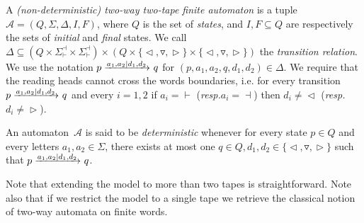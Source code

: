 \documentclass[runningheads, envcountsame, a4paper]{llncs}
\newcommand*{\ie}{i.e.\xspace}
\newcommand*{\resp}{\emph{resp.}\xspace}
\newcommand*{\bmark}{\vdash}
\newcommand*{\emark}{\dashv}
\newcommand*{\alphabet}{\Sigma}
\newcommand*{\atm}{\mathcal{A}}
\newcommand*{\states}{Q}
\newcommand*{\init}{I}
\newcommand*{\final}{F}
\newcommand*{\transrel}{\Delta}
\newcommand*{\goleft}{\vartriangleleft}
\newcommand*{\goright}{\vartriangleright}
\newcommand*{\stay}{\triangledown}
\newcommand*{\moves}{\{\goleft, \stay, \goright\}}
\newcommand*{\addbounds}[1]{{#1}^\emark_\bmark}
\newcommand*{\ealph}{\addbounds{\alphabet}}
\newcommand*{\adaptarrow}[2][]{\mathchoice
         {\xrightarrow{#2}_{#1}}
         {\xrightarrow{\smash{\lower1pt\hbox{$\scriptstyle #2$}}}_{#1}}
         {\text{Erreur}}
         {\text{Erreur}}}
\newcommand*{\stransition}[5][]{#2 \adaptarrow[#1]{#3\mid #4} #5}
\begin{document}
A \emph{(non-deterministic) two-way two-tape finite automaton} is a tuple
$\atm = \left(\states, \alphabet, \transrel,\init, \final \right)$, where
$\states$ is the set of \emph{states}, and $\init, \final \subseteq
\states$ are respectively the sets of \emph{initial} and \emph{final}
states.  We call $\transrel \subseteq \left(\states \times {\ealph} \times
  {\ealph}\right) \times (\states \times \moves \times \moves)$ the
\emph{transition relation}. We use the notation $\stransition{p}{a_1,
  a_2}{d_1, d_2}{q}$ for $(p, a_1, a_2, q, d_1, d_2) \in \transrel$. We
require that the reading heads cannot cross the words boundaries, \ie for
every transition $\stransition{p}{a_1, a_2}{d_1, d_2}{q}$ and every $i=1,2$
if $a_i = {\bmark}$ (\resp $a_i = {\emark}$) then $d_i \neq {\goleft}$
(\resp $d_i \neq {\goright}$).

An automaton~$\atm$ is said to be \emph{deterministic} whenever for every
state $p \in \states$ and every letters $ a_1, a_2 \in \alphabet$, there
exists at most one $q \in \states, d_1, d_2 \in \moves$ such that
$\stransition{p}{a_1, a_2}{d_1, d_2}{q}$.

Note that extending the model to more than two tapes is straightforward.
Note also that if we restrict the model to a single tape we retrieve the
classical notion of two-way automata on finite words.
\end{document}
